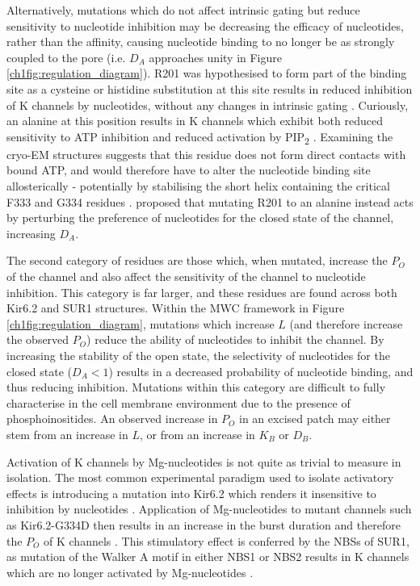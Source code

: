 Alternatively, mutations which do not affect intrinsic gating but reduce sensitivity to nucleotide inhibition may be decreasing the efficacy of nucleotides, rather than the affinity, causing nucleotide binding to no longer be as strongly coupled to the pore (i.e. $D_A$ approaches unity in Figure \ref{ch1fig:regulation_diagram}).
R201 was hypothesised to form part of the binding site as a cysteine \cite{proks_molecular_2004, antcliff_functional_2005} or histidine \cite{tammaro_functional_2006} substitution at this site results in reduced inhibition of K\ATP{} channels by nucleotides, without any changes in intrinsic gating .
Curiously, an alanine at this position results in K\ATP{} channels which exhibit both reduced sensitivity to ATP inhibition and reduced activation by PIP\textsubscript{2} \cite{shyng_structural_2000}.
Examining the cryo-EM structures suggests that this residue does not form direct contacts with bound ATP, and would therefore have to alter the nucleotide binding site allosterically - potentially by stabilising the short helix containing the critical F333 and G334 residues \cite{puljung_cryo-electron_2018}.
\citeauthor{ribalet_molecular_2003, john_molecular_2003} proposed that mutating R201 to an alanine instead acts by perturbing the preference of nucleotides for the closed state of the channel, increasing $D_A$.

The second category of residues are those which, when mutated, increase the $P_O$ of the channel and also affect the sensitivity of the channel to nucleotide inhibition.
This category is far larger, and these residues are found across both Kir6.2 and SUR1 structures.
Within the MWC framework in Figure \ref{ch1fig:regulation_diagram}, mutations which increase $L$ (and therefore increase the observed $P_O$) reduce the ability of nucleotides to inhibit the channel.
By increasing the stability of the open state, the selectivity of nucleotides for the closed state ($D_A < 1$) results in a decreased probability of nucleotide binding, and thus reducing inhibition.
Mutations within this category are difficult to fully characterise in the cell membrane environment due to the presence of phosphoinositides.
An observed increase in $P_O$ in an excised patch may either stem from an increase in $L$, or from an increase in $K_B$ or $D_B$.

Activation of K\ATP{} channels by Mg-nucleotides is not quite as trivial to measure in isolation.
The most common experimental paradigm used to isolate activatory effects is introducing a mutation into Kir6.2 which renders it insensitive to inhibition by nucleotides \cite{gribble_mgatp_1998-1, proks_activation_2010-1}.
Application of Mg-nucleotides to mutant channels such as Kir6.2-G334D then results in an increase in the burst duration and therefore the $P_O$ of K\ATP{} channels \cite{proks_activation_2010-1}.
This stimulatory effect is conferred by the NBSs of SUR1, as mutation of the Walker A motif in either NBS1 or NBS2 results in K\ATP{} channels which are no longer activated by Mg-nucleotides \cite{gribble_essential_1997,nichols_adenosine_1996}.

